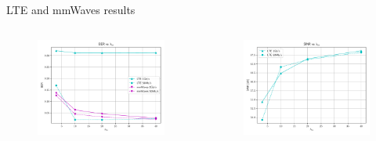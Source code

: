 \documentclass{beamer}
\begin{document}
\begin{frame}{LTE and mmWaves results}
\begin{columns}
\begin{figure}
					\vspace{-0.2in}
					\includegraphics[scale=0.32]{BER_lambda_bs_lte_mmwave_UDP}
				\end{figure}
				\begin{figure}
					\vspace{-0.3in}
					\includegraphics[scale=0.32]{SINR_lambda_bs_lte_mmwave_UDP}
				\end{figure}
		\end{columns}
	\end{frame}
\end{document}
